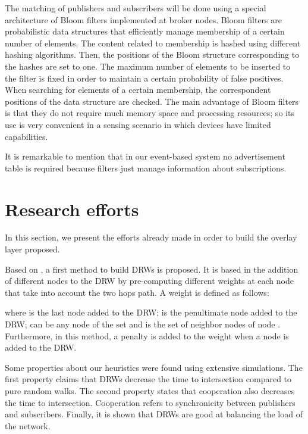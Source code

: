 \documentclass[conference]{IEEEtran}
\begin{document}
The matching of publishers and subscribers will be done using a special architecture of Bloom filters \cite{5751342} implemented at broker nodes. Bloom filters are probabilistic data structures that efficiently manage membership of a certain number of elements. The content related to membership is hashed using different hashing algorithms. Then, the positions of the Bloom structure corresponding to the hashes are set to one. The maximum number of elements to be inserted to the filter is fixed in order to maintain a certain probability of false positives. When searching for elements of a certain membership, the correspondent positions of the data structure are checked. The main advantage of Bloom filters is that they do not require much memory space and processing resources; so its use is very convenient in a sensing scenario in which devices have limited capabilities.

It is remarkable to mention that in our event-based system no advertisement table is required because filters just manage information about subscriptions.


\vspace{0.5em}
\section{Research efforts}
\label{sec:research}




In this section, we present the efforts already made in order to build the overlay layer proposed.

Based on \cite{ASCOMS13DRW}, a first method to build DRWs is proposed. It is based in the addition of different nodes to the DRW by pre-computing different weights at each node that take into account the two hops path. A weight is defined as follows:

where  is the last node added to the DRW;  is the penultimate node added to the DRW;  can be any node of the set  and  is the set of neighbor nodes of node . Furthermore, in this method, a penalty is added to the weight when a node is added to the DRW.

Some properties about our heuristics were found using extensive simulations. The first property claims that DRWs decrease the time to intersection compared to pure random walks. The second property states that cooperation also decreases the time to intersection. Cooperation refers to synchronicity between publishers and subscribers. Finally, it is shown that DRWs are good at balancing the load of the network.
\end{document}

